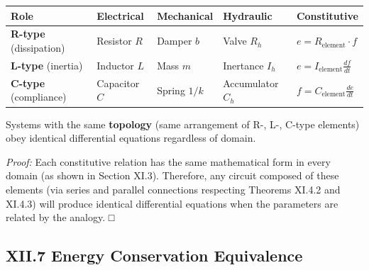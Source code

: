 \documentclass[
]{article}
\begin{document}
\begin{longtable}[]{@{}
  >{\raggedright\arraybackslash}p{}
  >{\raggedright\arraybackslash}p{}
  >{\raggedright\arraybackslash}p{}
  >{\raggedright\arraybackslash}p{}
  >{\raggedright\arraybackslash}p{}@{}}
\toprule\noalign{}
\begin{minipage}[b]{\linewidth}\raggedright
Role
\end{minipage} & \begin{minipage}[b]{\linewidth}\raggedright
Electrical
\end{minipage} & \begin{minipage}[b]{\linewidth}\raggedright
Mechanical
\end{minipage} & \begin{minipage}[b]{\linewidth}\raggedright
Hydraulic
\end{minipage} & \begin{minipage}[b]{\linewidth}\raggedright
Constitutive
\end{minipage} \\
\midrule\noalign{}
\endhead
\bottomrule\noalign{}
\endlastfoot
\textbf{R-type} (dissipation) & Resistor \(R\) & Damper \(b\) & Valve
\(R_h\) & \(e = R_{\text{element}} \cdot f\) \\
\textbf{L-type} (inertia) & Inductor \(L\) & Mass \(m\) & Inertance
\(I_h\) & \(e = I_{\text{element}} \frac{df}{dt}\) \\
\textbf{C-type} (compliance) & Capacitor \(C\) & Spring \(1/k\) &
Accumulator \(C_h\) & \(f = C_{\text{element}} \frac{de}{dt}\) \\
\end{longtable}

Systems with the same \textbf{topology} (same arrangement of R-, L-,
C-type elements) obey identical differential equations regardless of
domain.

\emph{Proof:} Each constitutive relation has the same mathematical form
in every domain (as shown in Section XI.3). Therefore, any circuit
composed of these elements (via series and parallel connections
respecting Theorems XI.4.2 and XI.4.3) will produce identical
differential equations when the parameters are related by the analogy. □

\subsection{XII.7 Energy Conservation
Equivalence}\label{xii.7-energy-conservation-equivalence}
\end{document}
